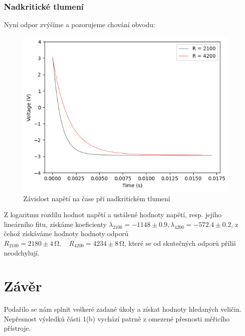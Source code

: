 \documentclass[czech,11pt,a4paper]{article}
\begin{document}
\begin{multicols}{2}
		\subsubsection{Nadkritické tlumení}
		Nyní odpor zvýšíme a pozorujeme chování obvodu:
		\begin{figure}[H]
			\begin{center}
				\includegraphics[max width=0.9\linewidth, center]{nadkriticke}
				\caption{Závislost napětí na čase při nadkritickém tlumení}\end{center}\end{figure}
		Z logaritmu rozdílu hodnot napětí a ustálené hodnoty napětí, resp. jejího lineárního fitu, získáme koeficienty $\lambda_{2100} = -1148 \pm0.9, \lambda_{4200} = -572.4 \pm0.2 $, z čehož získáváme hodnoty hodnoty odporů $R_{2100} = 2180 \pm 4\,\mathrm{\Omega},\quad R_{4200} = 4234 \pm 8 \,\mathrm{\Omega}$, které se od skutečných odporů příliš neodchylují.
		
		
		\section{Závěr}
		Podařilo se nám splnit veškeré zadané úkoly a získat hodnoty hledaných veličin. Nepřesnost výsledků části 1(b) vychází patrně z omezené přesnosti měřicího přístroje. 
	
		

		
		
		
		
		
	\end{multicols}
\end{document}
